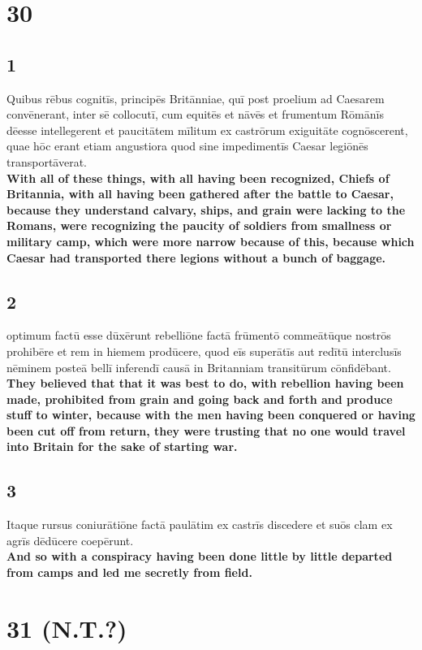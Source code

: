 \documentclass{article}
\begin{document}
\section*{30}

\subsection*{1}
Quibus rēbus cognitīs, principēs Britānniae, quī post proelium ad Caesarem convēnerant, inter sē collocutī, cum equitēs et nāvēs et frumentum Rōmānīs dēesse intellegerent et paucitātem mīlitum ex castrōrum exiguitāte cognōscerent, quae hōc erant etiam angustiora quod sine impedimentīs Caesar legiōnēs transportāverat.\\
\textbf{With all of these things, with all having been recognized, Chiefs of Britannia, with all having been gathered after the battle to Caesar, because they understand calvary, ships, and grain were lacking to the Romans, were recognizing the paucity of soldiers from smallness or military camp, which were more narrow because of this, because which Caesar had transported there legions without a bunch of baggage. }

\subsection*{2}
optimum factū esse dūxērunt rebelliōne factā frūmentō commeātūque nostrōs prohibēre et rem in hiemem prodūcere, quod eīs superātīs aut redītū interclusīs nēminem posteā bellī inferendī causā in Britanniam transitūrum cōnfidēbant. \\
\textbf{They believed that that it was best to do, with rebellion having been made, prohibited from grain and going back and forth and produce stuff to winter, because with the men having been conquered or having been cut off from return, they were trusting that no one would travel into Britain for the sake of starting war. }

\subsection*{3}
Itaque rursus coniurātiōne factā paulātim ex castrīs discedere et suōs clam ex agrīs dēdūcere coepērunt.\\
\textbf{And so with a conspiracy having been done little by little departed from camps and led me secretly from field.}


\section*{31 (N.T.?)}
\end{document}
